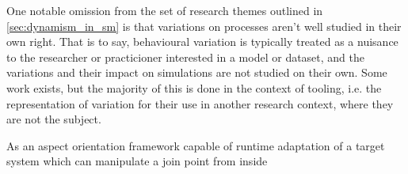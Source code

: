 
One notable omission from the set of research themes outlined in
\cref{sec:dynamism_in_sm} is that variations on processes aren't well
studied in their own right. That is to say, behavioural variation is typically
treated as a nuisance to the researcher or practicioner interested in a model or
dataset, and the variations and their impact on simulations are not studied on
their own. Some work exists, but the majority of this is done in the context of tooling, i.e.
the representation of variation for their use in another research context, where
they are not the subject.

As an aspect orientation framework capable of runtime adaptation of a target
system which can manipulate a join point from inside 